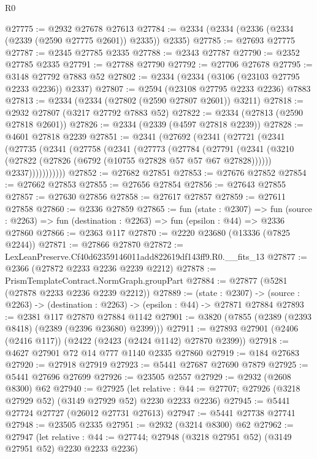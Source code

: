 \begin{lexlean}{R0}
\begin{coremodule}
@27775 := @2932 @27678 @27613
@27784 := @2334 (@2334 (@2336 (@2334 (@2339 (@2590 @27775 @2601)) @2335)) @2335)
@27785 := @27693 @27775
@27787 := @2345 @27785 @2335
@27788 := @2343 @27787
@27790 := @2352 @27785 @2335
@27791 := @27788 @27790
@27792 := @27706 @27678
@27795 := @3148 @27792 @7883 @52
@27802 := @2334 (@2334 (@3106 (@23103 @27795 @2233 @2236)) @2337)
@27807 := @2594 (@23108 @27795 @2233 @2236) @7883
@27813 := @2334 (@2334 (@27802 (@2590 @27807 @2601)) @3211)
@27818 := @2932 @27807 (@3217 @27792 @7883 @52)
@27822 := @2334 (@27813 (@2590 @27818 @2601))
@27826 := @2334 (@2339 (@4597 @27818 @2239))
@27828 := @4601 @27818 @2239
@27851 := @2341
    (@27692
      (@2341
        (@27721
          (@2341
            (@27735
              (@2341
                (@27758
                  (@2341
                    (@27773
                      (@27784
                        (@27791
                          (@2341
                            (@3210 (@27822 (@27826 (@6792 (@10755 @27828 @57 @57 @67 @27828))))))
                          @2337)))))))))))
@27852 := @27682 @27851
@27853 := @27676 @27852
@27854 := @27662 @27853
@27855 := @27656 @27854
@27856 := @27643 @27855
@27857 := @27630 @27856
@27858 := @27617 @27857
@27859 := @27611 @27858
@27860 := @2336 @27859
@27865 := fun (state : @2307) =>
  fun (source : @2263) => fun (destination : @2263) => fun (epsilon : @44) => @2336 @27860
@27866 := @2363 @117
@27870 := @2220 @23680 (@13336 (@7825 @2244))
@27871 := @27866 @27870
@27872 := LexLeanPreserve.Cf40d62359146011add822619df143ff9.R0.__fits_13
@27877 := @2366 (@27872 @2233 @2236 @2239 @2212)
@27878 := PrismTemplateContract.NormGraph.groupPart
@27884 := @27877 (@5281 (@27878 @2233 @2236 @2239 @2212))
@27889 := (state : @2307) ->
  (source : @2263) -> (destination : @2263) -> (epsilon : @44) -> @27871 @27884
@27893 := @2381 @117 @27870 @27884 @1142
@27901 := @3820 (@7855 (@2389 (@2393 @8418) (@2389 (@2396 @23680) @2399)))
@27911 := @27893 @27901 (@2406 (@2416 @117)) (@2422 (@2423 (@2424 @1142) @27870 @2399))
@27918 := @4627 @27901 @72 @14 @777 @1140 @2335 @27860
@27919 := @184 @27683
@27920 := @27918 @27919
@27923 := @5441 @27687 @27690 @7879
@27925 := @5441 @27696 @27699
@27926 := @23505 @2557
@27929 := @2932 (@2608 @8300) @62
@27940 := @27925
    (let relative : @44 := @27707; @27926 (@3218 @27929 @52) (@3149 @27929 @52) @2230 @2233 @2236)
@27945 := @5441 @27724 @27727 (@26012 @27731 @27613)
@27947 := @5441 @27738 @27741
@27948 := @23505 @2335
@27951 := @2932 (@3214 @8300) @62
@27962 := @27947
    (let relative : @44 := @27744; @27948 (@3218 @27951 @52) (@3149 @27951 @52) @2230 @2233 @2236)

\end{coremodule}
\end{lexlean}
